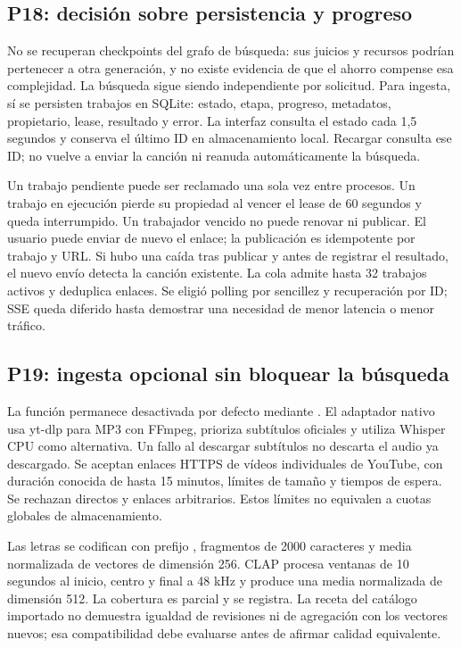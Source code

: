 \subsection{P18: decisión sobre persistencia y progreso}
No se recuperan checkpoints del grafo de búsqueda: sus juicios y recursos podrían
pertenecer a otra generación, y no existe evidencia de que el ahorro compense esa
complejidad. La búsqueda sigue siendo independiente por solicitud. Para ingesta,
sí se persisten trabajos en SQLite: estado, etapa, progreso, metadatos, propietario,
lease, resultado y error. La interfaz consulta el estado cada 1,5 segundos y conserva
el último ID en almacenamiento local. Recargar consulta ese ID; no vuelve a enviar
la canción ni reanuda automáticamente la búsqueda.

Un trabajo pendiente puede ser reclamado una sola vez entre procesos. Un trabajo
en ejecución pierde su propiedad al vencer el lease de 60 segundos y queda
interrumpido. Un trabajador vencido no puede renovar ni publicar. El usuario puede
enviar de nuevo el enlace; la publicación es idempotente por trabajo y URL. Si hubo
una caída tras publicar y antes de registrar el resultado, el nuevo envío detecta
la canción existente. La cola admite hasta 32 trabajos activos y deduplica enlaces.
Se eligió polling por sencillez y recuperación por ID; SSE queda diferido hasta
demostrar una necesidad de menor latencia o menor tráfico.

\subsection{P19: ingesta opcional sin bloquear la búsqueda}
La función permanece desactivada por defecto mediante
. El adaptador nativo usa yt-dlp para MP3 con
FFmpeg, prioriza subtítulos oficiales y utiliza Whisper CPU como alternativa.
Un fallo al descargar subtítulos no descarta el audio ya descargado. Se aceptan
enlaces HTTPS de vídeos individuales de YouTube, con duración conocida de hasta
15 minutos, límites de tamaño y tiempos de espera. Se rechazan directos y enlaces
arbitrarios. Estos límites no equivalen a cuotas globales de almacenamiento.

Las letras se codifican con prefijo , fragmentos de 2000
caracteres y media normalizada de vectores de dimensión 256. CLAP procesa ventanas
de 10 segundos al inicio, centro y final a 48 kHz y produce una media normalizada
de dimensión 512. La cobertura es parcial y se registra. La receta del catálogo
importado no demuestra igualdad de revisiones ni de agregación con los vectores
nuevos; esa compatibilidad debe evaluarse antes de afirmar calidad equivalente.

